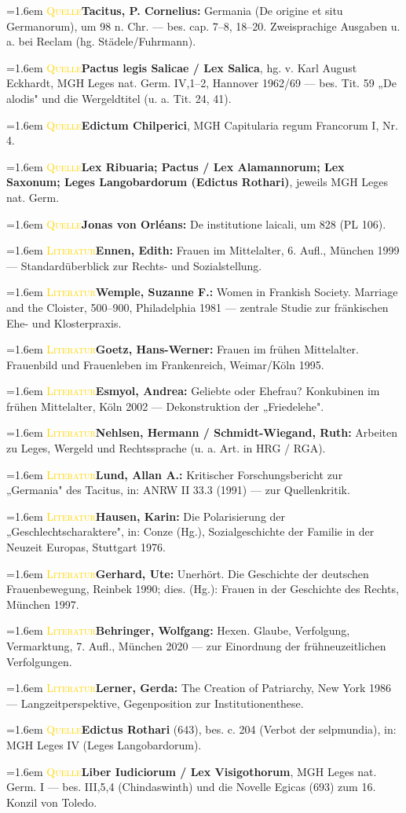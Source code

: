 \documentclass[11pt,a4paper,ngerman]{scrartcl}
\newcommand{\litentry}[2]{\par\noindent\hangindent=1.6em\hangafter=1
  {\footnotesize\scshape\textcolor{gold}{#1}}\quad #2\par\smallskip}
\begin{document}
\litentry{Quelle}{\textbf{Tacitus, P. Cornelius:} Germania (De origine et situ Germanorum), um 98 n. Chr. — bes. cap. 7–8, 18–20. Zweisprachige Ausgaben u. a. bei Reclam (hg. Städele/Fuhrmann).}
\litentry{Quelle}{\textbf{Pactus legis Salicae / Lex Salica}, hg. v. Karl August Eckhardt, MGH Leges nat. Germ. IV,1–2, Hannover 1962/69 — bes. Tit. 59 „De alodis" und die Wergeldtitel (u. a. Tit. 24, 41).}
\litentry{Quelle}{\textbf{Edictum Chilperici}, MGH Capitularia regum Francorum I, Nr. 4.}
\litentry{Quelle}{\textbf{Lex Ribuaria; Pactus / Lex Alamannorum; Lex Saxonum; Leges Langobardorum (Edictus Rothari)}, jeweils MGH Leges nat. Germ.}
\litentry{Quelle}{\textbf{Jonas von Orléans:} De institutione laicali, um 828 (PL 106).}
\litentry{Literatur}{\textbf{Ennen, Edith:} Frauen im Mittelalter, 6. Aufl., München 1999 — Standardüberblick zur Rechts- und Sozialstellung.}
\litentry{Literatur}{\textbf{Wemple, Suzanne F.:} Women in Frankish Society. Marriage and the Cloister, 500–900, Philadelphia 1981 — zentrale Studie zur fränkischen Ehe- und Klosterpraxis.}
\litentry{Literatur}{\textbf{Goetz, Hans-Werner:} Frauen im frühen Mittelalter. Frauenbild und Frauenleben im Frankenreich, Weimar/Köln 1995.}
\litentry{Literatur}{\textbf{Esmyol, Andrea:} Geliebte oder Ehefrau? Konkubinen im frühen Mittelalter, Köln 2002 — Dekonstruktion der „Friedelehe".}
\litentry{Literatur}{\textbf{Nehlsen, Hermann / Schmidt-Wiegand, Ruth:} Arbeiten zu Leges, Wergeld und Rechtssprache (u. a. Art. in HRG / RGA).}
\litentry{Literatur}{\textbf{Lund, Allan A.:} Kritischer Forschungsbericht zur „Germania" des Tacitus, in: ANRW II 33.3 (1991) — zur Quellenkritik.}
\litentry{Literatur}{\textbf{Hausen, Karin:} Die Polarisierung der „Geschlechtscharaktere", in: Conze (Hg.), Sozialgeschichte der Familie in der Neuzeit Europas, Stuttgart 1976.}
\litentry{Literatur}{\textbf{Gerhard, Ute:} Unerhört. Die Geschichte der deutschen Frauenbewegung, Reinbek 1990; dies. (Hg.): Frauen in der Geschichte des Rechts, München 1997.}
\litentry{Literatur}{\textbf{Behringer, Wolfgang:} Hexen. Glaube, Verfolgung, Vermarktung, 7. Aufl., München 2020 — zur Einordnung der frühneuzeitlichen Verfolgungen.}
\litentry{Literatur}{\textbf{Lerner, Gerda:} The Creation of Patriarchy, New York 1986 — Langzeitperspektive, Gegenposition zur Institutionenthese.}
\litentry{Quelle}{\textbf{Edictus Rothari} (643), bes. c. 204 (Verbot der selpmundia), in: MGH Leges IV (Leges Langobardorum).}
\litentry{Quelle}{\textbf{Liber Iudiciorum / Lex Visigothorum}, MGH Leges nat. Germ. I — bes. III,5,4 (Chindaswinth) und die Novelle Egicas (693) zum 16. Konzil von Toledo.}
\end{document}

